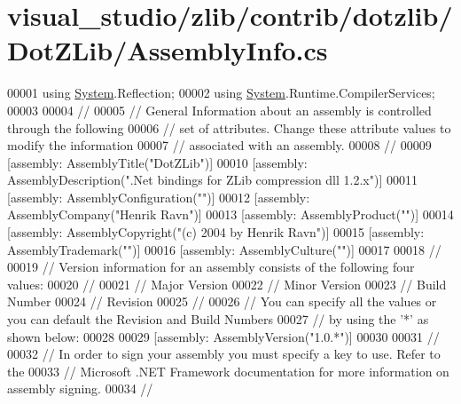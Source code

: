 \hypertarget{visual__studio_2zlib_2contrib_2dotzlib_2_dot_z_lib_2_assembly_info_8cs_source}{}\section{visual\+\_\+studio/zlib/contrib/dotzlib/\+Dot\+Z\+Lib/\+Assembly\+Info.cs}
\label{visual__studio_2zlib_2contrib_2dotzlib_2_dot_z_lib_2_assembly_info_8cs_source}

\begin{DoxyCode}
00001 \textcolor{keyword}{using} \hyperlink{namespace_system}{System}.Reflection;
00002 \textcolor{keyword}{using} \hyperlink{namespace_system}{System}.Runtime.CompilerServices;
00003 
00004 \textcolor{comment}{//}
00005 \textcolor{comment}{// General Information about an assembly is controlled through the following}
00006 \textcolor{comment}{// set of attributes. Change these attribute values to modify the information}
00007 \textcolor{comment}{// associated with an assembly.}
00008 \textcolor{comment}{//}
00009 [assembly: AssemblyTitle(\textcolor{stringliteral}{"DotZLib"})]
00010 [assembly: AssemblyDescription(\textcolor{stringliteral}{".Net bindings for ZLib compression dll 1.2.x"})]
00011 [assembly: AssemblyConfiguration(\textcolor{stringliteral}{""})]
00012 [assembly: AssemblyCompany(\textcolor{stringliteral}{"Henrik Ravn"})]
00013 [assembly: AssemblyProduct(\textcolor{stringliteral}{""})]
00014 [assembly: AssemblyCopyright(\textcolor{stringliteral}{"(c) 2004 by Henrik Ravn"})]
00015 [assembly: AssemblyTrademark(\textcolor{stringliteral}{""})]
00016 [assembly: AssemblyCulture(\textcolor{stringliteral}{""})]
00017 
00018 \textcolor{comment}{//}
00019 \textcolor{comment}{// Version information for an assembly consists of the following four values:}
00020 \textcolor{comment}{//}
00021 \textcolor{comment}{//      Major Version}
00022 \textcolor{comment}{//      Minor Version}
00023 \textcolor{comment}{//      Build Number}
00024 \textcolor{comment}{//      Revision}
00025 \textcolor{comment}{//}
00026 \textcolor{comment}{// You can specify all the values or you can default the Revision and Build Numbers}
00027 \textcolor{comment}{// by using the '*' as shown below:}
00028 
00029 [assembly: AssemblyVersion(\textcolor{stringliteral}{"1.0.*"})]
00030 
00031 \textcolor{comment}{//}
00032 \textcolor{comment}{// In order to sign your assembly you must specify a key to use. Refer to the}
00033 \textcolor{comment}{// Microsoft .NET Framework documentation for more information on assembly signing.}
00034 \textcolor{comment}{//}

\end{DoxyCode}
